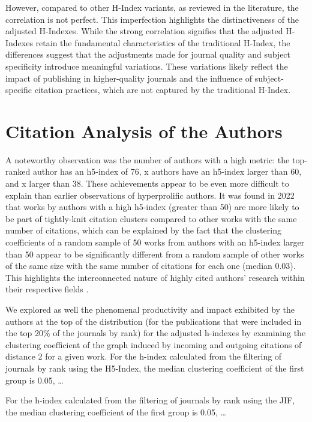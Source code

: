 However, compared to other H-Index variants, as reviewed in the literature, the
correlation is not perfect. This imperfection highlights the distinctiveness of
the adjusted H-Indexes. While the strong correlation signifies that the
adjusted H-Indexes retain the fundamental characteristics of the traditional
H-Index, the differences suggest that the adjustments made for journal quality
and subject specificity introduce meaningful variations. These variations
likely reflect the impact of publishing in higher-quality journals and the
influence of subject-specific citation practices, which are not captured by the
traditional H-Index.

\section{Citation Analysis of the Authors}

A noteworthy observation was the number of authors with a high metric: the
top-ranked author has an h5-index of 76, x authors have an h5-index larger than
60, and x larger than 38. These achievements appear to be even more difficult
to explain than earlier observations of hyperprolific authors. It was found in
2022 that works by authors with a high h5-index (greater than 50) are more
likely to be part of tightly-knit citation clusters compared to other works
with the same number of citations, which can be explained by the fact that the
clustering coefficients of a random sample of 50 works from authors with an
h5-index larger than 50 appear to be significantly different from a random
sample of other works of the same size with the same number of citations for
each one (median 0.03). This highlights the interconnected nature of highly
cited authors' research within their respective fields \cite{Spi23g}.

We explored as well the phenomenal productivity and impact exhibited by the
authors at the top of the distribution (for the publications that were included
in the top 20\% of the journals by rank) for the adjusted h-indexes by
examining the clustering coefficient of the graph induced by incoming and
outgoing citations of distance 2 for a given work. For the h-index calculated
from the filtering of journals by rank using the H5-Index, the median
clustering coefficient of the first group is 0.05, \dots

For the h-index calculated from the filtering of journals by rank using the
JIF, the median clustering coefficient of the first group is 0.05, \dots

